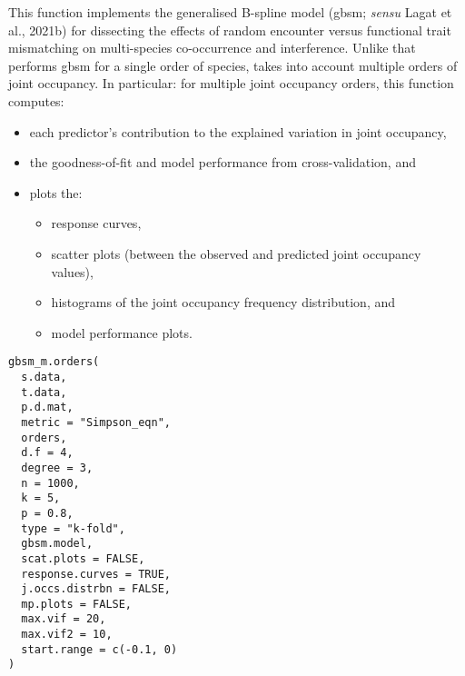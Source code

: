 \documentclass[a4paper]{book}
\begin{document}
%
\begin{Description}\relax
This function implements the generalised B-spline model (gbsm; \emph{sensu} Lagat et al., 2021b) for dissecting the
effects of random encounter versus functional trait mismatching on multi-species co-occurrence and interference.
Unlike  that performs gbsm for a single order of species,  takes
into account multiple orders of joint occupancy. In particular: for multiple joint occupancy orders, this
function computes:
\begin{itemize}

\item{} each predictor's contribution to the explained variation in joint occupancy,
\item{} the goodness-of-fit and model performance from cross-validation, and
\item{} plots the:
\begin{itemize}

\item{} response curves,
\item{} scatter plots (between the observed and predicted joint occupancy values),
\item{} histograms of the joint occupancy frequency distribution, and
\item{} model performance plots.

\end{itemize}


\end{itemize}

\end{Description}
%
\begin{Usage}
\begin{verbatim}
gbsm_m.orders(
  s.data,
  t.data,
  p.d.mat,
  metric = "Simpson_eqn",
  orders,
  d.f = 4,
  degree = 3,
  n = 1000,
  k = 5,
  p = 0.8,
  type = "k-fold",
  gbsm.model,
  scat.plots = FALSE,
  response.curves = TRUE,
  j.occs.distrbn = FALSE,
  mp.plots = FALSE,
  max.vif = 20,
  max.vif2 = 10,
  start.range = c(-0.1, 0)
)
\end{verbatim}
\end{Usage}
%
\end{document}
